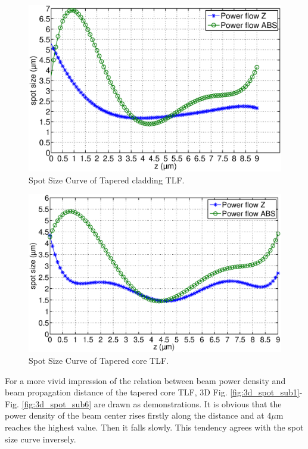 \begin{figure}[!ht]
		\centering
		\includegraphics[width=0.7 \textwidth]{bilder/Tapered_cladding_spot_curve}
		\caption{Spot Size Curve of Tapered cladding TLF.}
		\label{fig:Tapered_cladding_spot_curve}
\end{figure} 
\begin{figure}[!ht]
		\centering
		\includegraphics[width=0.7 \textwidth]{bilder/Tapered_core_spot_curve}
		\caption{Spot Size Curve of Tapered core TLF.}
 		\label{fig:Tapered_core_spot_curve}	
\end{figure}
For a more vivid impression of the relation between beam power density and beam propagation distance of the tapered core TLF, 3D Fig. \ref{fig:3d_spot_sub1}-Fig. \ref{fig:3d_spot_sub6} are drawn as demonstrations. It is obvious that the power density of the beam center rises firstly along the distance and at $4\mu$m reaches the highest value. Then it falls slowly. This tendency agrees with the spot size curve inversely. \\
